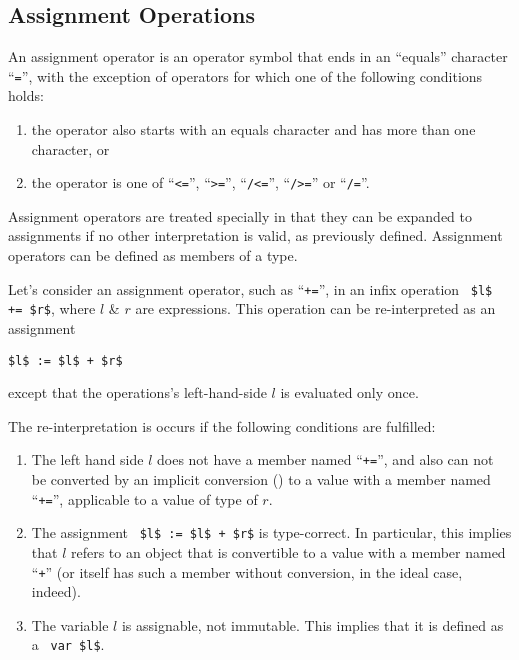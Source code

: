 




\subsection{Assignment Operations}
\label{sec:assignment-operations}

An assignment operator is an operator symbol that ends in an ``equals'' character ``\lstinline!=!'', with the exception of operators for which one of the following conditions holds: 
\begin{enumerate}
\item the operator also starts with an equals character and has more than one character, or
\item the operator is one of ``\lstinline!<=!'', ``\lstinline!>=!'', ``\lstinline!/<=!'', ``\lstinline!/>=!'' or ``\lstinline!/=!''.
\end{enumerate}

Assignment operators are treated specially in that they can be expanded to assignments if no other interpretation is valid, as previously defined. Assignment operators can be defined as members of a type. 

Let's consider an assignment operator, such as ``\lstinline!+=!'', in an infix operation ~\lstinline!$l$ += $r$!, where $l$ \& $r$ are expressions. This operation can be re-interpreted as an assignment
\begin{lstlisting}
$l$ := $l$ + $r$
\end{lstlisting}
except that the operations's left-hand-side $l$ is evaluated only once. 

The re-interpretation is occurs if the following conditions are fulfilled:
\begin{enumerate}
  \item The left hand side $l$ does not have a member named ``\lstinline!+=!'', and also can not be converted by an implicit conversion () to a value with a member named ``\lstinline!+=!'', applicable to a value of type of $r$. 
  \item The assignment ~\lstinline!$l$ := $l$ + $r$! is type-correct. In particular, this implies that $l$ refers to an object that is convertible to a value with a member named ``\lstinline!+!'' (or itself has such a member without conversion, in the ideal case, indeed). 
  \item The variable $l$ is assignable, not immutable. This implies that it is defined as a ~\lstinline!var $l$!. 
\end{enumerate}

